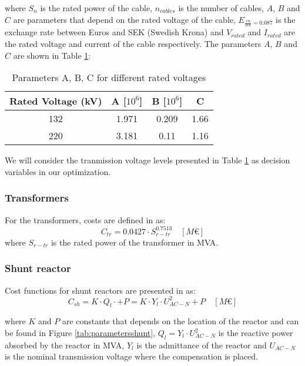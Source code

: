 \documentclass[a4paper,11pt, titlepage, twoside]{article}
\begin{document}
where $S_n$ is the rated power of the cable, $n_{cables}$ is the number of cables, $A$, $B$ and $C$ are parameters that depend on the rated voltage of the cable, $E_{\frac{eu}{sek}=0.087}$ is the exchange rate between Euros and SEK (Swedish Krona) and $V_{rated}$ and $I_{rated}$ are the rated voltage and current of the cable respectively.
The parameters $A$, $B$ and $C$ are shown in Table \ref{tab:parameterscab}:
\begin{table}[H]
    \centering
    \begin{tabular}{c|c|c|c}
    \hline
    \textbf{Rated Voltage (kV)} & \textbf{A [$10^6$]} & \textbf{B [$10^6$]} & \textbf{C} \\
    \hline
    132 & 1.971 & 0.209 & 1.66 \\
    220 & 3.181 & 0.11 & 1.16 \\
    \hline
    \end{tabular}
    \caption{Parameters A, B, C for different rated voltages \cite{chalmers}}
    \label{tab:parameterscab}
    \end{table}
We will consider the tranmission voltage levels presented in Table \ref{tab:parameterscab} as decision variables in our optimization.


\subsubsection{Transformers}
For the transformers, costs are defined in \cite{costraf} as:
\begin{equation}
    C_{tr}= 0.0427 \cdot S_{r-tr}^{0.7513} \quad \left[M\euro\right]
\end{equation}
where $S_{r-tr}$ is the rated power of the transformer in MVA.

\subsubsection{Shunt reactor}
Cost functions for shunt reactors are presented in \cite{paperbase} as:
\begin{equation}\label{eq:shuntcost}
    C_{sh}= K \cdot Q_l \cdot + P = K \cdot Y_l\cdot U_{AC-N}^2 + P \quad \left[M\euro\right]
\end{equation}

where $K$ and $P$ are constants that depends on the location of the reactor and can be found in Figure \ref{tab:parametersshunt}, $Q_l = Y_l\cdot U_{AC-N}^2$ is the reactive power absorbed by the reactor in MVA,
$Y_l$ is the admittance of the reactor and $U_{AC-N}$ is the nominal transmission voltage where the compensation is placed.
\end{document}
